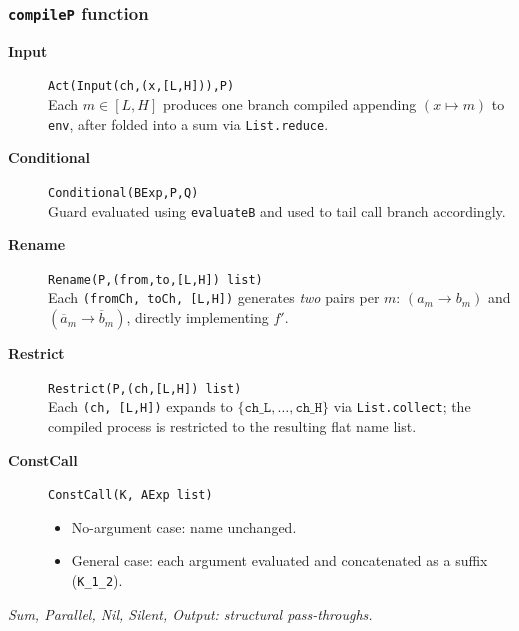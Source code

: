 \documentclass[t]{beamer}
\begin{document}

\begin{frame}
  \frametitle{\texttt{compileP} function}
  \footnotesize
  \vspace{0.2cm}
  \begin{description}
    \item[\textbf{Input}] {\scriptsize\texttt{Act(Input(ch,(x,[L,H])),P)}}\\[-2pt]
                          Each $m \in [L,H]$ produces one branch compiled appending
                          $(x \mapsto m)$ to \texttt{env}, after folded into a sum
                          via \texttt{List.reduce}.
    \item[\textbf{Conditional}] {\scriptsize\texttt{Conditional(BExp,P,Q)}}\\[-2pt]
                                Guard evaluated using \texttt{evaluateB} and used to
                                tail call branch accordingly.
    \item[\textbf{Rename}] {\scriptsize\texttt{Rename(P,(from,to,[L,H]) list)}}\\[-2pt]
                           Each \texttt{(fromCh, toCh, [L,H])} generates \emph{two}
                           pairs per $m$: $(a_m \to b_m)$ and
                           $(\overline{a}_m \to \overline{b}_m)$, directly
                           implementing $f'$.
    \item[\textbf{Restrict}] {\scriptsize\texttt{Restrict(P,(ch,[L,H]) list)}}\\[-2pt]
                             Each \texttt{(ch, [L,H])} expands to
                             $\{\texttt{ch\_L},\ldots,\texttt{ch\_H}\}$ via
                             \texttt{List.collect}; the compiled process is
                             restricted to the resulting flat name list.
    \item[\textbf{ConstCall}] {\scriptsize\texttt{ConstCall(K, AExp list)}}\\[-2pt]
                              \begin{itemize}
                                \item No-argument case: name unchanged.
                                \item General case: each argument evaluated and concatenated
                                      as a suffix (\texttt{K\_1\_2}).
                              \end{itemize}
  \end{description}

  \vspace{0.2cm}
  \small\textit{Sum, Parallel, Nil, Silent, Output: structural pass-throughs.}

\end{frame}
\end{document}
